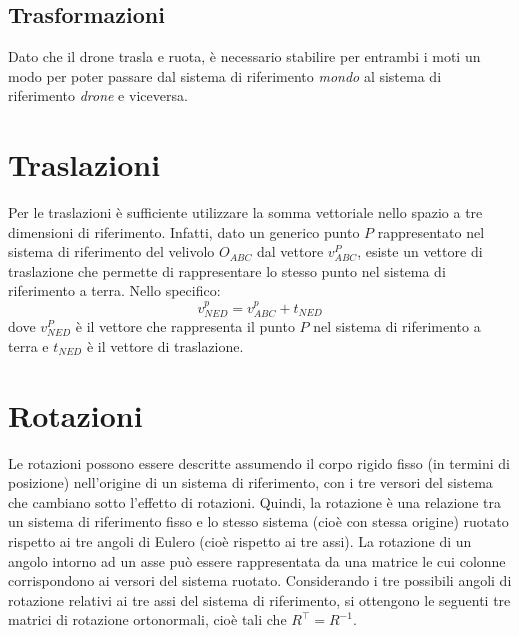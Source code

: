 \subsection{Trasformazioni}

Dato che il drone trasla e ruota, è necessario stabilire per entrambi i moti un modo per poter passare dal sistema di riferimento \emph{mondo} al sistema di riferimento \emph{drone} e viceversa. 

\section*{Traslazioni}
Per le traslazioni è sufficiente utilizzare la somma vettoriale nello spazio a tre dimensioni di riferimento. Infatti, dato un generico punto $P$ rappresentato nel sistema di riferimento del velivolo $O_{ABC}$ dal vettore $v^P_{ABC}$, esiste un vettore di traslazione che permette di rappresentare lo stesso punto nel sistema di riferimento a terra. Nello specifico:
\[ v^p_{NED} = v^p_{ABC} + t_{NED} \]
dove $v^P_{NED}$ è il vettore che rappresenta il punto $P$ nel sistema di riferimento a terra e $t_{NED}$ è il vettore di traslazione. 

\section*{Rotazioni}
Le rotazioni possono essere descritte assumendo il corpo rigido fisso (in termini di posizione) nell'origine di un sistema di riferimento, con i tre versori del sistema che cambiano sotto l'effetto di rotazioni. Quindi, la rotazione è una relazione tra un sistema di riferimento fisso e lo stesso sistema (cioè con stessa origine) ruotato rispetto ai tre angoli di Eulero (cioè rispetto ai tre assi). La rotazione di un angolo intorno ad un asse può essere rappresentata da una matrice le cui colonne corrispondono ai versori del sistema ruotato. Considerando i tre possibili angoli di rotazione relativi ai tre assi del sistema di riferimento, si ottengono le seguenti tre matrici di rotazione ortonormali, cioè tali che $R^\top = R^{-1}$.

